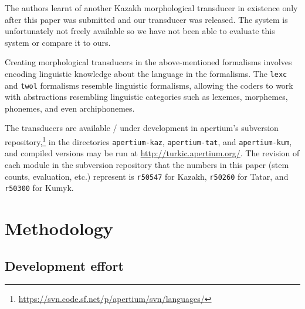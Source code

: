 \documentclass[a4paper,11pt,twocolumn]{article}
\begin{document}
The authors learnt of another Kazakh morphological transducer in existence \citep{bekmanova2013} only after this paper was submitted and our transducer was released.  The system is unfortunately not freely available so we have not been able to evaluate this system or compare it to ours.

Creating morphological transducers in the above-mentioned formalisms involves encoding linguistic knowledge about the language in the formalisms.  The \texttt{lexc} and \texttt{twol} formalisms resemble linguistic formalisms, allowing the coders to work with abstractions resembling linguistic categories such as lexemes, morphemes, phonemes, and even archiphonemes.


The transducers are available / under development in apertium's subversion repository,\footnote{{\scriptsize \url{https://svn.code.sf.net/p/apertium/svn/languages/}}} in the directories \texttt{apertium-kaz}, \texttt{apertium-tat}, and \texttt{apertium-kum}, and compiled versions may be run at \url{http://turkic.apertium.org/}.  The revision of each module in the subversion repository that the numbers in this paper (stem counts, evaluation, etc.) represent is \texttt{r50547} for Kazakh, \texttt{r50260} for Tatar, and \texttt{r50300} for Kumyk.


\section{Methodology}\label{sec:methodology}





\subsection{Development effort}

\end{document}
